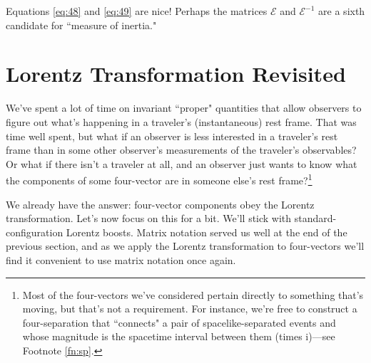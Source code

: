 \documentclass[12pt]{article}
\begin{document}
Equations \ref{eq:48} and \ref{eq:49} are nice! Perhaps the matrices $\mathcal{E}$ and $\mathcal{E}^{-1}$ are a sixth candidate for ``measure of inertia."



\section{Lorentz Transformation Revisited}

We've spent a lot of time on invariant ``proper" quantities that allow observers to figure out what's happening in a traveler's (instantaneous) rest frame. That was time well spent, but what if an observer is less interested in a traveler's rest frame than in some other observer's measurements of the traveler's observables? Or what if there isn't a traveler at all, and an observer just wants to know what the components of some four-vector are in someone else's rest frame?\footnote{Most of the four-vectors we've considered pertain directly to something that's moving, but that's not a requirement. For instance, we're free to construct a four-separation that ``connects" a pair of spacelike-separated events and whose magnitude is the spacetime interval between them (times $\mathrm{i}$)---see Footnote \ref{fn:sp}.}

We already have the answer: four-vector components obey the Lorentz transformation. Let's now focus on this for a bit. We'll stick with standard-configuration Lorentz boosts. Matrix notation served us well at the end of the previous section, and as we apply the Lorentz transformation to four-vectors we'll find it convenient to use matrix notation once again.
\end{document}
